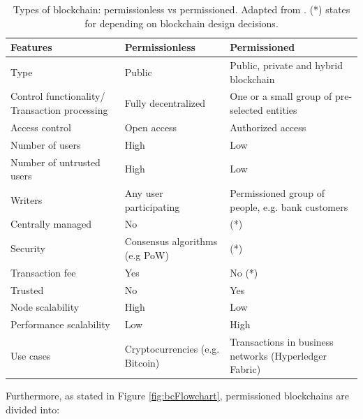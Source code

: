 \begin{table}[bth]
	\myfloatalign \footnotesize
	\begin{tabularx}{\textwidth}{>{\raggedright\arraybackslash}p{4cm} >{\raggedright\arraybackslash}p{6cm}>{\raggedright\arraybackslash}p{6cm}}
	\textbf{Features} & \textbf{Permissionless} & \textbf{Permissioned}\\ 
		\hline
		Type & Public & Public, private and hybrid blockchain \\
		Control functionality/ Transaction processing & Fully decentralized & One or a small group of pre-selected entities \\
		Access control & Open access & Authorized access \\ 
		Number of users & High & Low \\
		Number of untrusted users & High & Low \\
		Writers & Any user participating & Permissioned group of people, e.g. bank customers\\
		Centrally managed & No & (*) \\
		Security & Consensus algorithms (e.g PoW) & (*) \\
		Transaction fee & Yes & No (*) \\
		Trusted & No & Yes \\
		Node scalability & High & Low \\
		Performance scalability & Low & High \\
		Use cases & Cryptocurrencies (e.g. Bitcoin) & Transactions in business networks (Hyperledger Fabric) \\ \hline
	\end{tabularx}
		\caption{Types of blockchain: permissionless vs permissioned. Adapted from \citep{wust2017you}. (*) states for depending on blockchain design decisions.}
	\label{tab:blockchainTypes}
\end{table}

Furthermore, as stated in Figure \ref{fig:bcFlowchart}, permissioned blockchains are divided into:

